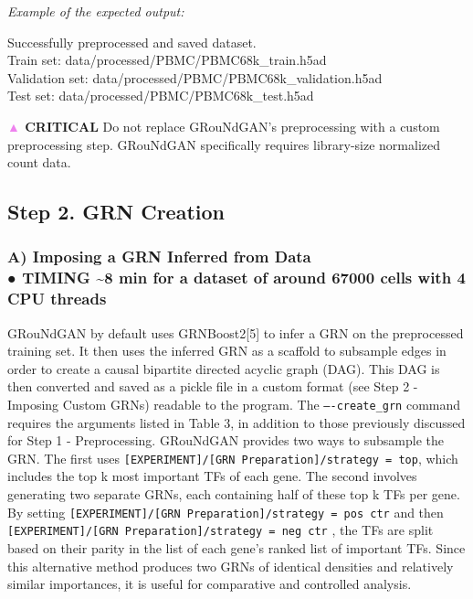 \begin{tcolorbox}
\textit{Example of the expected output: }
\begin{codeblock}
Successfully preprocessed and saved dataset.\\
Train set: data/processed/PBMC/PBMC68k\_train.h5ad\\
Validation set: data/processed/PBMC/PBMC68k\_validation.h5ad\\
Test set: data/processed/PBMC/PBMC68k\_test.h5ad
\end{codeblock}
\textbf{\textcolor{violet}{▲} CRITICAL} Do not replace GRouNdGAN’s preprocessing with a custom preprocessing step.
GRouNdGAN specifically requires library-size normalized count data. 

\subsection*{Step 2. GRN Creation}

\subsubsection*{A) Imposing a GRN Inferred from Data\\● TIMING \textasciitilde 8 min for a dataset of around 67000 cells with 4 CPU threads}

GRouNdGAN by default uses GRNBoost2[5] to infer a GRN on the preprocessed training set. It
then uses the inferred GRN as a scaffold to subsample edges in order to create a causal bipartite
directed acyclic graph (DAG). This DAG is then converted and saved as a pickle file in a custom
format (see Step 2 - Imposing Custom GRNs) readable to the program. The \texttt{–-create\_grn}
command requires the arguments listed in Table 3, in addition to those previously discussed for
Step 1 - Preprocessing. GRouNdGAN provides two ways to subsample the GRN. The first uses
\texttt{[EXPERIMENT]/[GRN Preparation]/strategy = top}, which includes the top k most
important TFs of each gene. The second involves generating two separate GRNs, each containing
half of these top k TFs per gene. By setting \texttt{[EXPERIMENT]/[GRN Preparation]/strategy
= pos ctr} and then \texttt{[EXPERIMENT]/[GRN Preparation]/strategy = neg ctr} , the TFs are split based on their parity in the list of each gene’s ranked list of important TFs. Since this
alternative method produces two GRNs of identical densities and relatively similar importances,
it is useful for comparative and controlled analysis. 


\end{tcolorbox}
